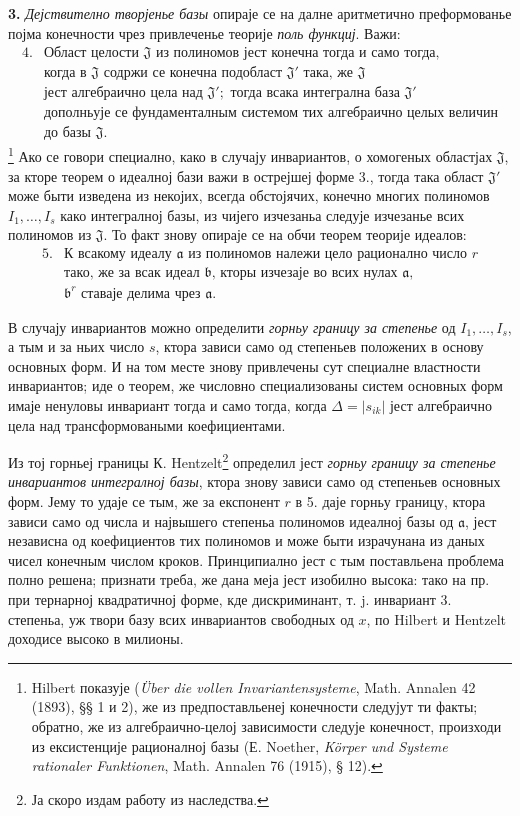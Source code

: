﻿\documentclass[11pt]{article}
\providecommand{\mJ}{\mathfrak J}
\providecommand{\ma}{\mathfrak a}
\providecommand{\mb}{\mathfrak b}
\providecommand{\D}{\Delta}
\begin{document}
\textbf{3.} \emph{Дејствително творјенье базы} опираје се на далне аритметично преформованье појма конечности чрез привлеченье теорије \emph{поль функциј}. Важи:
\[
\begin{array}{ll}
4.& \text{Област целости }\mJ\text{ из полиномов јест конечна тогда и само тогда,}\\
& \text{когда в }\mJ\text{ содржи се конечна подобласт }\mJ'\text{ така, же }\mJ\\
& \text{јест алгебраично цела над }\mJ';\text{ тогда всака интегрална база }\mJ'\\
& \text{дополньује се фундаменталным системом тих алгебраично целых величин}\\
& \text{до базы }\mJ.
\end{array}
\]
\footnote{Hilbert показује (\emph{Über die vollen Invariantensysteme}, Math. Annalen 42 (1893), §§ 1 и 2), же из предпоставльенеј конечности следујут ти факты; обратно, же из алгебраично-целој зависимости следује конечност, произходи из ексистенције рационалној базы (Е. Noether, \emph{Körper und Systeme rationaler Funktionen}, Math. Annalen 76 (1915), § 12).}
Ако се говори специално, како в случају инвариантов, о хомогеных областјах $\mJ$, за кторе теорем о идеалној бази важи в острејшеј форме 3., тогда така област $\mJ'$ може быти изведена из некојих, всегда обстојячих, конечно многих полиномов $I_1,\ldots,I_s$ како интегралној базы, из чијего изчезаньа следује изчезанье всих полиномов из $\mJ$. То факт знову опираје се на обчи теорем теорије идеалов:
\[
\begin{array}{ll}
5.& \text{К всакому идеалу }\ma\text{ из полиномов належи цело рационално число }r\\
& \text{тако, же за всак идеал }\mb\text{, кторы изчезаје во всих нулах }\ma,\\
& \mb^r\text{ ставаје делима чрез }\ma.
\end{array}
\]

В случају инвариантов можно определити \emph{горньу границу за степенье} од $I_1,\ldots,I_s$, а тым и за ньих число $s$, ктора зависи само од степеньев положених в основу основных форм. И на том месте знову привлечены сут специалне властности инвариантов; иде о теорем, же числовно специализованы систем основных форм имаје ненуловы инвариант тогда и само тогда, когда $\D=|s_{ik}|$ јест алгебраично цела над трансформоваными коефициентами.

Из тој горньеј границы К. Hentzelt\footnote{Ја скоро издам работу из наследства.} определил јест \emph{горньу границу за степенье инвариантов интегралној базы}, ктора знову зависи само од степеньев основных форм. Јему то удаје се тым, же за експонент $r$ в 5. даје горньу границу, ктора зависи само од числа и највышего степеньа полиномов идеалној базы од $\ma$, јест независна од коефициентов тих полиномов и може быти израчунана из даных чисел конечным числом кроков. Принципиално јест с тым поставльена проблема полно решена; признати треба, же дана меја јест изобилно высока: тако на пр. при тернарној квадратичној форме, кде дискриминант, т. j. инвариант 3. степеньа, уж твори базу всих инвариантов свободных од $x$, по Hilbert и Hentzelt доходисе высоко в милионы.
\end{document}
